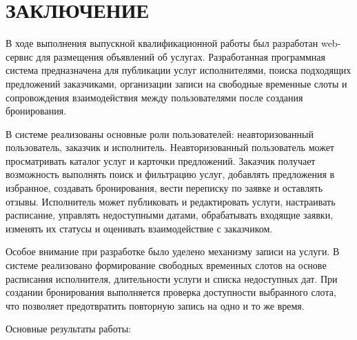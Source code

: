 \section*{ЗАКЛЮЧЕНИЕ}

В ходе выполнения выпускной квалификационной работы был разработан web-сервис для размещения объявлений об услугах. Разработанная программная система предназначена для публикации услуг исполнителями, поиска подходящих предложений заказчиками, организации записи на свободные временные слоты и сопровождения взаимодействия между пользователями после создания бронирования.

В системе реализованы основные роли пользователей: неавторизованный пользователь, заказчик и исполнитель. Неавторизованный пользователь может просматривать каталог услуг и карточки предложений. Заказчик получает возможность выполнять поиск и фильтрацию услуг, добавлять предложения в избранное, создавать бронирования, вести переписку по заявке и оставлять отзывы. Исполнитель может публиковать и редактировать услуги, настраивать расписание, управлять недоступными датами, обрабатывать входящие заявки, изменять их статусы и оценивать взаимодействие с заказчиком.

Особое внимание при разработке было уделено механизму записи на услуги. В системе реализовано формирование свободных временных слотов на основе расписания исполнителя, длительности услуги и списка недоступных дат. При создании бронирования выполняется проверка доступности выбранного слота, что позволяет предотвратить повторную запись на одно и то же время.

Основные результаты работы:

